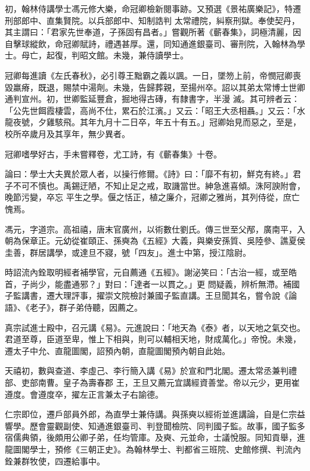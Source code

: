 \begin{pinyinscope}
 初，翰林侍講學士馮元修大樂，命冠卿檢新閱事跡。又預選《景祐廣樂記》，特遷刑部郎中、直集賢院。以兵部郎中、知制誥判
 太常禮院，糾察刑獄。奉使契丹，其主謂曰：「君家先世奉道，子孫固有昌者。」嘗觀所著《蘄春集》，詞極清麗，因自擊球縱飲，命冠卿賦詩，禮遇甚厚。還，同知通進銀臺司、審刑院，入翰林為學士。母亡，起復，判昭文館。未幾，兼侍讀學士。



 冠卿每進讀《左氏春秋》，必引尊王黜霸之義以諷。一日，墜笏上前，帝憫冠卿喪毀羸瘠，既退，賜禁中湯劑。未幾，告歸葬親，至揚州卒。詔以其弟太常博士世卿通判宣州。初，世卿監延豐倉，掘地得古磚，有隸書字，半漫
 滅。其可辨者云：「公先世餌霞棲雲，高尚不仕，累石於江濱。」又云：「昭王大丞相聶。」又云：「水龍夜號，夕雞駭飛。其年九月十二日卒，年五十有五。」冠卿始見而惡之，至是，校所卒歲月及其享年，無少異者。



 冠卿嗜學好古，手未嘗釋卷，尤工詩，有《蘄春集》十卷。



 論曰：學士大夫異於眾人者，以操行修爾。《詩》曰：「靡不有初，鮮克有終。」君子不可不慎也。禹錫迂陋，不知止足之戒，取譏當世。紳急進喜傾。洙阿諛附會，晚節污變，卒忘
 平生之學。偃之恬正，植之廉介，冠卿之雅尚，其列侍從，庶亡愧焉。



 馮元，字道宗。高祖禧，唐末官廣州，以術數仕劉氏。傳三世至父邴，廣南平，入朝為保章正。元幼從崔頤正、孫奭為《五經》大義，與樂安孫質、吳陸參、譙夏侯圭善，群居講學，或達旦不寢，號「四友」。進士中第，授江陰尉。



 時詔流內銓取明經者補學官，元自薦通《五經》。謝泌笑曰：「古治一經，或至皓首，子尚少，能盡通邪？」對曰：「達者一以貫之。」更
 問疑義，辨析無滯。補國子監講書，遷大理評事，擢崇文院檢討兼國子監直講。王旦聞其名，嘗令說《論語》、《老子》，群子弟侍聽，因薦之。



 真宗試進士殿中，召元講《易》。元進說曰：「地天為《泰》者，以天地之氣交也。君道至尊，臣道至卑，惟上下相與，則可以輔相天地，財成萬化。」帝悅。未幾，遷太子中允、直龍圖閣，詔預內朝，直龍圖閣預內朝自此始。



 天禧初，數與查道、李虛己、李行簡入講《易》於宣和門北閣。遷太常丞兼判禮部、吏部南曹。皇子為壽春郡
 王，王旦又薦元宜講經資善堂。帝以元少，更用崔遵度。會遵度卒，擢左正言兼太子右諭德。



 仁宗即位，遷戶部員外郎，為直學士兼侍講。與孫奭以經術並進講論，自是仁宗益響學。歷會靈觀副使、知通進銀臺司、判登聞檢院、同判國子監。故事，國子監多宿儒典領，後頗用公卿子弟，任均管庫。及奭、元並命，士議悅服。同知貢舉，進龍圖閣學士，預修《三朝正史》。為翰林學士、判都省三班院、史館修撰、判流內銓兼群牧使，四遷給事中。




\end{pinyinscope}
